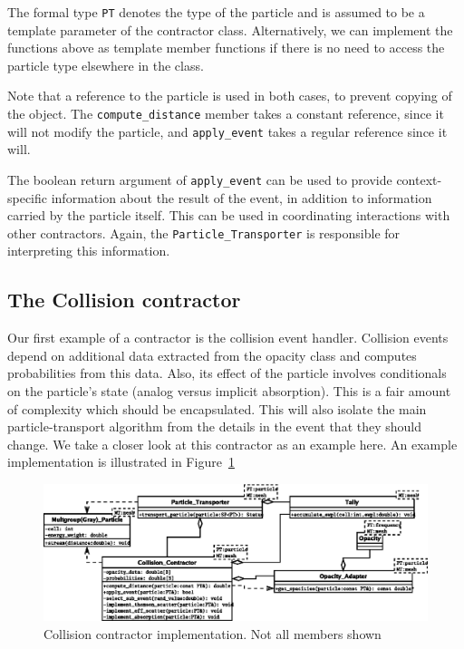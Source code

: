 \documentclass[memo]{ResearchNote}
\begin{document}
The formal type {\tt PT} denotes the type of the particle and is
assumed to be a template parameter of the contractor class.
Alternatively, we can implement the functions above as template member
functions if there is no need to access the particle type elsewhere in
the class.

Note that a reference to the particle is used in both cases, to
prevent copying of the object.  The {\tt compute\_distance} member
takes a constant reference, since it will not modify the particle, and
{\tt apply\_event} takes a regular reference since it will.

The boolean return argument of {\tt apply\_event} can be used to
provide context-specific information about the result of the event, in
addition to information carried by the particle itself. This can be
used in coordinating interactions with other contractors. Again, the
{\tt Particle\_Transporter} is responsible for interpreting this
information. 

\subsection{The Collision contractor}

Our first example of a contractor is the collision event handler.
Collision events depend on additional data extracted from the opacity
class and computes probabilities from this data. Also, its effect of
the particle involves conditionals on the particle's state (analog
versus implicit absorption). This is a fair amount of complexity which
should be encapsulated. This will also isolate the main
particle-transport algorithm from the details in the event that they
should change. We take a closer look at this contractor as an example
here. An example implementation is illustrated in
Figure~\ref{fig:collision_contractor}

\begin{center}
  \begin{figure}
    \includegraphics[width=6.5in]{figures/collision_contractor}
    \caption{Collision contractor implementation. Not all members shown} 
    \label{fig:collision_contractor}
  \end{figure}
\end{center}
\end{document}
